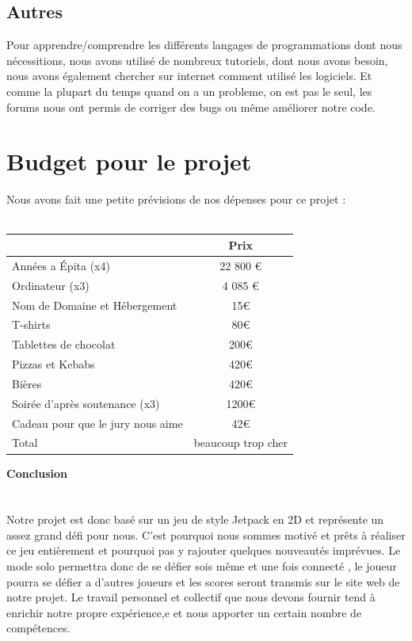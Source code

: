 \documentclass [11pt]{report}
\begin{document}
	\section {Autres}

	Pour apprendre/comprendre les différents langages de programmations dont nous nécessitions, nous avons utilisé de nombreux tutoriels, dont nous avons besoin, nous avons également chercher sur internet comment utilisé les logiciels. Et comme la plupart du temps quand on a un probleme, on est pas le seul, les forums nous ont permis de corriger des bugs ou même améliorer notre code.


\chapter {Budget pour le projet}
	Nous avons fait une petite prévisions de nos dépenses pour ce projet :\\\\

				\begin{tabular}{|l|c|}
				\hline
		 		 & Prix \\
				\hline
				Années a \'Epita (x4) & 22 800 € \\
				\hline
				Ordinateur (x3) & 4 085 €  \\
				\hline
				Nom de Domaine et Hébergement &  15€ \\
				\hline
				T-shirts & 80€ \\
				\hline
				Tablettes de chocolat & 200€ \\
				\hline
				Pizzas et Kebabs & 420€  \\
				\hline
				Bières  & 420€   \\
	          			 \hline
				Soirée d'après soutenance (x3) & 1200€\\
				\hline 
				Cadeau pour que le jury nous aime & 42€ \\
				\hline
				Total & beaucoup trop cher \\
				\hline
				
			\end{tabular}
\newpage
\textbf{{\Huge Conclusion}}\\
\\
\\\indent	Notre projet est donc basé sur un jeu de style Jetpack en 2D et représente un assez grand défi pour nous. C’est pourquoi nous sommes motivé et prêts à réaliser ce jeu entièrement et pourquoi pas y rajouter quelques nouveautés imprévues. Le mode solo permettra donc de se défier sois même et une fois connecté , le joueur pourra se défier a d’autres joueurs et les scores seront transmis sur le site web de notre projet. Le travail personnel et collectif que nous devons fournir tend à enrichir notre propre expérience,e et nous apporter un certain nombre de comp\'etences.
\end{document}
